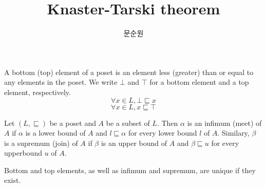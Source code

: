 \documentclass[9pt]{beamer}
\title{Knaster-Tarski theorem}
\author{문순원}
\begin{document}
\begin{frame}
  \titlepage
\end{frame}

\begin{frame}
  \begin{definition}
    A bottom (top) element of a poset is an element less (greater) than or equal to any elements in the poset.
    We write $\bot$ and $\top$ for a bottom element and a top element, respectively.
    $$
    \forall x \in L, \bot \sqsubseteq x
    $$
    $$
    \forall x \in L, x \sqsubseteq \top
    $$
  \end{definition}


  \begin{definition}
    Let $(L,\sqsubseteq)$ be a poset and $A$ be a subset of $L$.
    Then $\alpha$ is an infimum (meet) of $A$ if $\alpha$ is a lower bound of $A$
    and $l \sqsubseteq \alpha$ for every lower bound $l$ of $A$.
    Similary, $\beta$ is a supremum (join) of $A$ if $\beta$ is an upper bound of $A$
    and $\beta \sqsubseteq u$ for every upperbound $u$ of $A$.
  \end{definition}

  Bottom and top elements, as well as infimum and supremum, are unique if they exist.
\end{frame}
\end{document}

